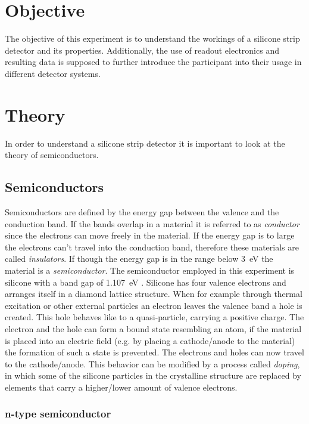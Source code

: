 \section{Objective}
\label{sec:Obj}
The objective of this experiment is to understand the workings of a silicone strip detector and its properties. Additionally, the use of readout electronics and resulting data is supposed to further introduce the participant into their usage in different detector systems.
\section{Theory}
\label{sec:Theo}

In order to understand a silicone strip detector it is important to look at the theory of semiconductors.
\subsection{Semiconductors}
Semiconductors are defined by the energy gap between the valence and the conduction band. If the bands overlap in a material it is referred to as \textit{conductor} since the electrons can move freely in the material. If the energy gap is to large the electrons can't travel into the conduction band, therefore these materials are called \textit{insulators}. If though the energy gap is in the range below \qty{3}{\eV} the material is a \textit{semiconductor}. The semiconductor employed in this experiment is silicone with a band gap of \qty{1.107}{\eV} \cite{V15}. Silicone has four valence electrons and arranges itself in a diamond lattice structure. When for example through thermal excitation or other external particles an electron leaves the valence band a hole is created. This hole behaves like to a quasi-particle, carrying a positive charge. The electron and the hole can form a bound state resembling an atom, if the material is placed into an electric field (e.g. by placing a cathode/anode to the material) the formation of such a state is prevented. The electrons and holes can now travel to the cathode/anode. This behavior can be modified by a process called \textit{doping}, in which some of the silicone particles in the crystalline structure are replaced by elements that carry a higher/lower amount of valence electrons. %

\subsubsection{n-type semiconductor}

